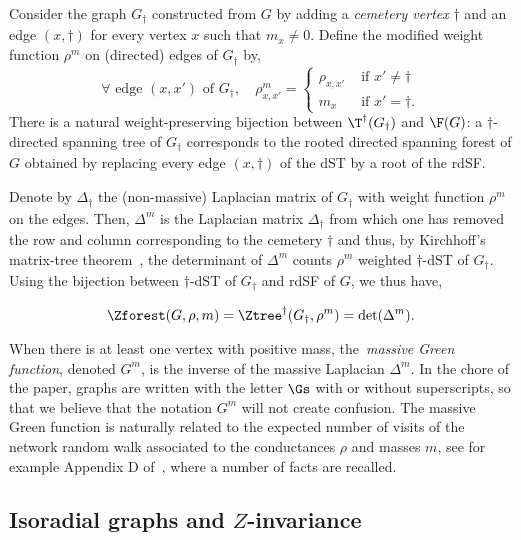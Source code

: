 \documentclass[a4paper,twoside,11pt]{article}
\begin{document}
Consider the graph $G_\dag$ constructed from $G$ by adding a \emph{cemetery vertex} $\dag$ and an edge $(x,\dag)$ for every 
vertex $x$ such that $m_x\neq 0$. Define the modified weight function $\rho^m$ on (directed) edges of $G_\dag$ by, 
\begin{equation*}
\forall\text{ edge $(x,x')$ of }G_\dag,\quad
\rho^m_{x,x'}=
\begin{cases}
\rho_{x,x'} & \text{ if $x'\neq\dag$}\\
m_x & \text{ if $x'=\dag$}.
\end{cases}
\end{equation*}
There is a natural weight-preserving bijection between $\T^\dag(G_\dag)$ and $\F(G)$: a $\dag$-directed spanning tree of $G_\dag$ corresponds to the 
rooted directed spanning forest of $G$
obtained by replacing every edge $(x,\dag)$ of the dST by a root of the rdSF. 

Denote by $\Delta_\dag$ the (non-massive) Laplacian matrix of $G_\dag$ with weight function $\rho^m$ on the edges. 
Then, $\Delta^m$ is the Laplacian matrix $\Delta_\dag$ from which one has removed
the row and column corresponding to the cemetery $\dag$ and thus, by Kirchhoff's matrix-tree theorem~\cite{Kirchhoff,Tutte}, 
the determinant of $\Delta^m$ counts $\rho^m$ weighted $\dag$-dST of $G_\dag$. Using the bijection between $\dag$-dST of $G_\dag$ and rdSF of $G$,
we thus have,
\begin{thm}\label{thm:Kirchhoff_Tutte}
\begin{equation*}
\Zforest(G,\rho,m)=\Ztree^\dag(G_\dag,\rho^m)=\det(\Delta^m).
\end{equation*}
\end{thm}

When there is at least one vertex with positive mass, the~\emph{massive Green function}, denoted $G^m$, 
is the inverse of the massive Laplacian $\Delta^m$. In the chore of the paper, graphs are written with the letter $\Gs$ with or without
superscripts, so that we believe that the notation $G^m$ will not create confusion. The massive Green function is naturally related to
the expected number of visits of the network random walk associated to the conductances $\rho$ and masses $m$, see for example Appendix 
D of~\cite{BdTR1}, where a number of facts are recalled.

\subsection{Isoradial graphs and $Z$-invariance}\label{sec:isoradial_Z_invariance}
\end{document}
